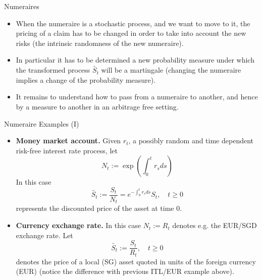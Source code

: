 \documentclass{beamer}
\begin{document}
\begin{frame}{Numeraires}
	\begin{itemize}
		\item When the numeraire is a stochastic process, and we want to move to it, the pricing of a claim has to be changed in order to take into account the new risks (the intrinsic randomness of the new numeraire).
		\item In particular it has to be determined a new probability measure under which the transformed process $\tilde{S_t}$ will be a martingale (changing the numeraire implies a change of the probability measure).
		\item It remains to understand how to pass from a numeraire to another, and hence by a measure to another in an arbitrage free setting.
	\end{itemize}
\end{frame}

\begin{frame}{Numeraire Examples (I)}
	\begin{itemize}
		\item \textbf{Money market account.} Given $r_t$, a possibly random and time dependent risk-free interest rate process, let
		\begin{equation*}
			N_t := \exp\left(\int_0^t r_s ds\right)
		\end{equation*}
		In this case 
		\begin{equation*}
			\tilde{S_t}:=\frac{S_t}{N_t}=e^{-\int_0^t r_s ds}S_t, \quad t \ge 0
		\end{equation*}
		represents the discounted price of the asset at time 0.
		\item \textbf{Currency exchange rate.} In this case $N_t := R_t$ denotes e.g. the EUR/SGD exchange rate. Let
		\begin{equation*}
			\tilde{S_t}:=\frac{S_t}{R_t}, \quad t \ge 0
		\end{equation*}
		denotes the price of a local (SG) asset quoted in units of the foreign currency (EUR) (notice the difference with previous ITL/EUR example above).
	\end{itemize}
\end{frame}
\end{document}
